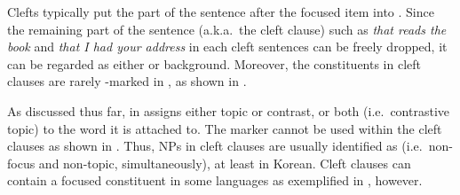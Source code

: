



Clefts typically put the part of the sentence after the focused item
into . Since the remaining part of the
sentence (a.k.a.\ the cleft clause) such as \textit{that reads the
  book} and \textit{that I had your address} in each cleft sentences
can be freely dropped, it can be regarded as either  or
background.  Moreover, the constituents in cleft clauses are rarely
\nun-marked in , as shown in .






\noindent As discussed thus far, \nun in  assigns either
topic or contrast, or both (i.e.\ contrastive topic) to the word it is
attached to. The marker \nun cannot be used within the
cleft clauses as shown in . Thus, NPs in cleft
clauses are usually identified as  (i.e.\ non-focus
and non-topic, simultaneously), at least in Korean.  Cleft clauses can
contain a focused constituent in some languages as exemplified in
, however. 


